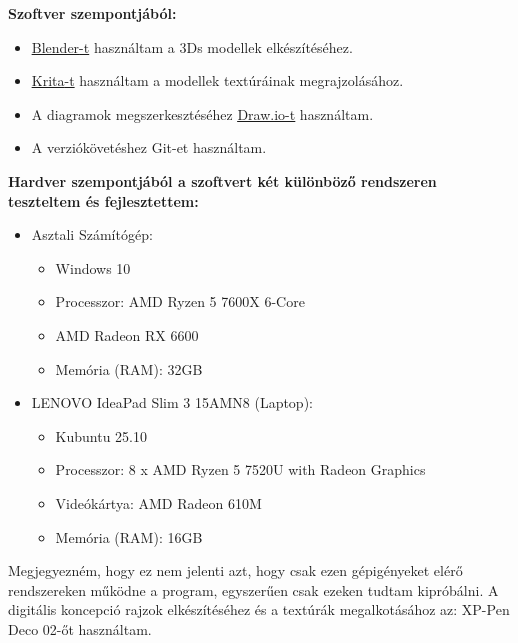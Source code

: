 \textbf{Szoftver szempontjából:}
\begin{itemize}
	\item \href{https://www.blender.org/download/}{\underline{Blender}-t} \cite{Blender} használtam a 3Ds modellek elkészítéséhez.
	\item \href{https://krita.org/en/}{\underline{Krita}-t} \cite{Krita} használtam a modellek textúráinak megrajzolásához.
	\item A diagramok megszerkesztéséhez \href{https://www.drawio.com/}{\underline{Draw.io-t}} \cite{Draw.io} használtam.
	\item A verziókövetéshez Git-et használtam.
\end{itemize}

\textbf{Hardver szempontjából a szoftvert két különböző rendszeren teszteltem és fejlesztettem:}
\begin{itemize}
	\item Asztali Számítógép:
	      \begin{itemize}
		      \item Windows 10
		      \item Processzor: AMD Ryzen 5 7600X 6-Core
		      \item AMD Radeon RX 6600
		      \item Memória (RAM): 32GB
	      \end{itemize}
	\item LENOVO IdeaPad Slim 3 15AMN8 (Laptop):
	      \begin{itemize}
		      \item Kubuntu 25.10
		      \item Processzor: 8 x AMD Ryzen 5 7520U with Radeon Graphics
		      \item Videókártya: AMD Radeon 610M
		      \item Memória (RAM): 16GB
	      \end{itemize}
\end{itemize}

Megjegyezném, hogy ez nem jelenti azt, hogy csak ezen gépigényeket elérő rendszereken működne a program, egyszerűen csak ezeken tudtam kipróbálni.
A digitális koncepció rajzok elkészítéséhez és a textúrák megalkotásá\-hoz az: XP-Pen Deco 02-őt használtam.

